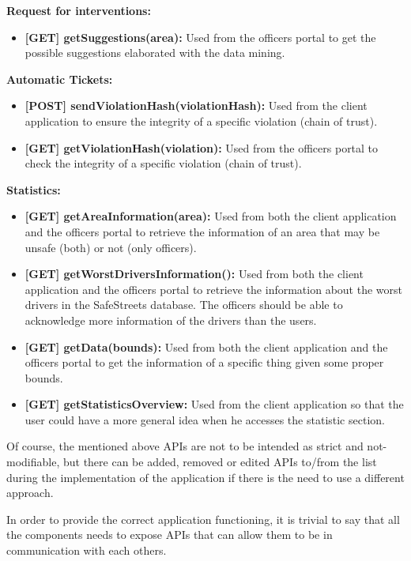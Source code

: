 \textbf{Request for interventions:}
\begin{itemize}
	\item \textbf{[GET] getSuggestions(area):} Used from the officers portal to get the possible suggestions elaborated with the data mining.
\end{itemize}

\textbf{Automatic Tickets:}
\begin{itemize}
	\item \textbf{[POST] sendViolationHash(violationHash):}  Used from the client application to ensure the integrity of a specific violation (chain of trust). 
	\item \textbf{[GET] getViolationHash(violation):}  Used from the officers portal to check the integrity of a specific violation (chain of trust). 
\end{itemize}

\textbf{Statistics:}
\begin{itemize}
	\item \textbf{[GET] getAreaInformation(area):} Used from both the client application and the officers portal to retrieve the information of an area that may be unsafe (both) or not (only officers).
	\item \textbf{[GET] getWorstDriversInformation():} Used from both the client application and the officers portal to retrieve the information about the worst drivers in the SafeStreets database. The officers should be able to acknowledge more information of the drivers than the users.
	\item \textbf{[GET] getData(bounds):} Used from both the client application and the officers portal to get the information of a specific thing given some proper bounds.
	\item \textbf{[GET] getStatisticsOverview:} Used from the client application so that the user could have a more general idea when he accesses the statistic section.
\end{itemize}

Of course, the mentioned above APIs are not to be intended as strict and not-modifiable, but there can be added, removed or edited APIs to/from the list during the implementation of the application if there is the need to use a different approach.

In order to provide the correct application functioning, it is trivial to say that all the components needs to expose APIs that can allow them to be in communication with each others.

